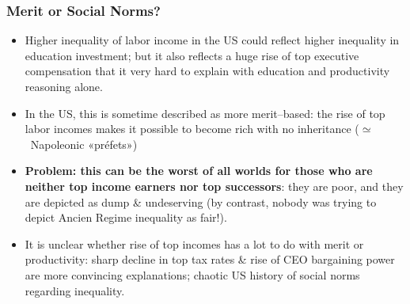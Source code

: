 \begin{frame}[label=MeritVNorms]
\frametitle{Merit or Social Norms?}
\begin{itemize}
\item
Higher inequality of labor income in the US could reflect higher inequality in education investment; but it also reflects a huge rise of top executive compensation that it very hard to explain with education and productivity reasoning alone.
\item 
In the US, this is sometime described as more merit--based: the rise of top labor incomes makes it possible to become rich with no inheritance ($\simeq$~Napoleonic «préfets»)
\item 
\textbf{Problem: this can be the worst of all worlds for those who are neither top income earners nor top successors}: they are poor, and they are depicted as dump \& undeserving (by contrast, nobody was trying to depict Ancien Regime inequality as fair!).
\item 
It is unclear whether rise of top incomes has a lot to do with merit or productivity: sharp decline in top tax rates \& rise of CEO bargaining power are more convincing explanations; chaotic US history of social norms regarding inequality.
\end{itemize}
\end{frame}


